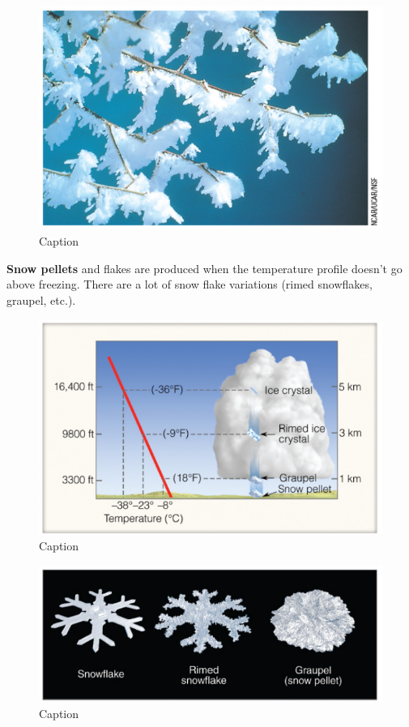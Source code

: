 \documentclass[12pt,oneside]{book}
\begin{document}
\begin{figure}

{\centering \includegraphics[width=0.9\linewidth]{figures/Figure343} 

}

\caption{Caption}\label{fig:Sleet5}
\end{figure}

\textbf{Snow pellets} and flakes are produced when the temperature
profile doesn't go above freezing. There are a lot of snow flake
variations (rimed snowflakes, graupel, etc.).

\begin{figure}

{\centering \includegraphics[width=0.9\linewidth]{figures/Figure344} 

}

\caption{Caption}\label{fig:Pellets}
\end{figure}

\begin{figure}

{\centering \includegraphics[width=0.9\linewidth]{figures/Figure345} 

}

\caption{Caption}\label{fig:Pellets2}
\end{figure}
\end{document}
